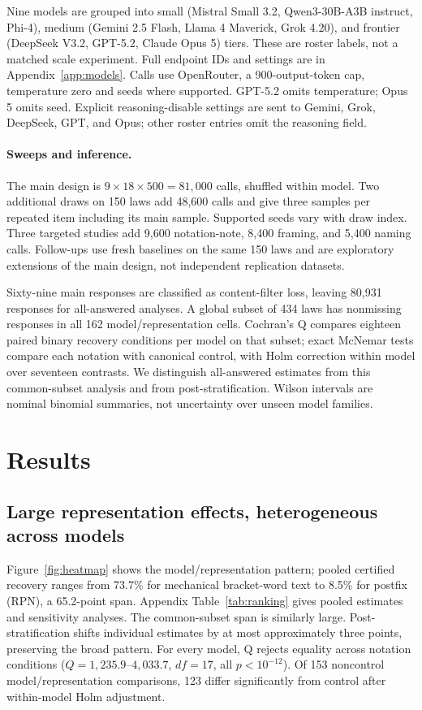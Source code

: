 \documentclass{article}
\newcommand{\pct}{\%}
\begin{document}
Nine models are grouped into small (Mistral Small 3.2, Qwen3-30B-A3B instruct,
Phi-4), medium (Gemini 2.5 Flash, Llama 4 Maverick, Grok 4.20), and frontier
(DeepSeek V3.2, GPT-5.2, Claude Opus 5) tiers. These are roster labels, not a
matched scale experiment. Full endpoint IDs and settings are in
Appendix~\ref{app:models}. Calls use OpenRouter, a 900-output-token cap,
temperature zero and seeds where supported. GPT-5.2 omits temperature; Opus 5
omits seed. Explicit reasoning-disable settings are sent to Gemini, Grok,
DeepSeek, GPT, and Opus; other roster entries omit the reasoning field.

\paragraph{Sweeps and inference.}
The main design is $9\times18\times500=81,000$ calls, shuffled within model.
Two additional draws on 150 laws add 48,600 calls and give three samples per
repeated item including its main sample. Supported seeds vary with draw index.
Three targeted studies add 9,600 notation-note, 8,400 framing, and 5,400 naming
calls. Follow-ups use fresh baselines on the same 150 laws and are exploratory
extensions of the main design, not independent replication datasets.

Sixty-nine main responses are classified as content-filter loss, leaving 80,931
responses for all-answered analyses. A global subset of 434 laws has nonmissing
responses in all 162 model/representation cells. Cochran's Q compares eighteen
paired binary recovery conditions per model on that subset; exact McNemar tests
compare each notation with canonical control, with Holm correction within model
over seventeen contrasts. We distinguish all-answered estimates from this
common-subset analysis and from post-stratification. Wilson intervals are nominal
binomial summaries, not uncertainty over unseen model families.

\section{Results}
\label{sec:results}

\subsection{Large representation effects, heterogeneous across models}

Figure~\ref{fig:heatmap} shows the model/representation pattern; pooled
certified recovery ranges from 73.7\pct{} for
mechanical bracket-word text to 8.5\pct{} for postfix (RPN), a 65.2-point span.
Appendix Table~\ref{tab:ranking} gives pooled estimates and sensitivity analyses.
The common-subset span is similarly large. Post-stratification shifts individual
estimates by at most approximately three points, preserving the broad pattern.
For every model, Q rejects equality across notation conditions
($Q=1,235.9$--$4,033.7$, $df=17$, all $p<10^{-12}$).
Of 153 noncontrol model/representation comparisons, 123 differ significantly from
control after within-model Holm adjustment.
\end{document}
